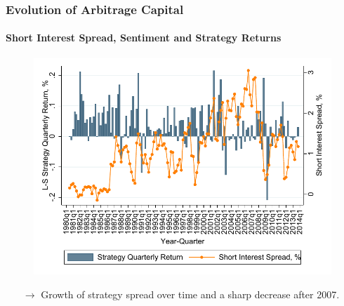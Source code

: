 \documentclass{beamer}
\begin{document}
\begin{frame}
\frametitle{Evolution of Arbitrage Capital}
\framesubtitle{Short Interest Spread, Sentiment and Strategy Returns}
\vspace*{-0.3cm}
\begin{figure}[htbp]
\centering
	\includegraphics[scale=0.7,trim=4 4 4 4,clip]{figures/misp_evolution_profitability_yq_sentiment.pdf} 
	\label{tab:misp_evolution_profitability_yq_sentiment}%
\end{figure}
\begin{itemize}
\vspace*{-0.4cm}
\item[$\rightarrow$] Growth of strategy spread over time and a sharp decrease after 2007.
\end{itemize}
\end{frame}
\end{document}

